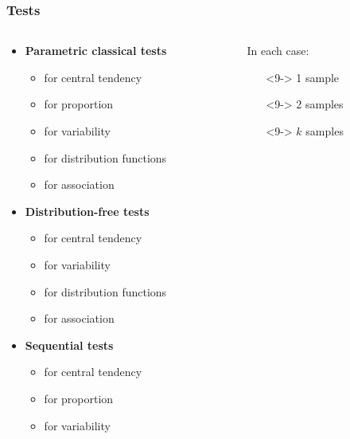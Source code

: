 \documentclass[xcolor={table}]{beamer}
\begin{document}
\begin{frame}\frametitle{Tests}
  \begin{columns}
    \begin{column}{0.7\textwidth}
      \begin{itemize}
      \item<1->\textbf{Parametric classical tests}
        \begin{itemize}
        \item<4-> for central tendency
        \item<5-> for proportion
        \item<6-> for variability
        \item<7-> for distribution functions
        \item<8-> for association
        \end{itemize}
      \item<2->\textbf{Distribution-free tests}
        \begin{itemize}
        \item<4-> for central tendency
        \item<6-> for variability
        \item<7-> for distribution functions
        \item<8-> for association
        \end{itemize}
      \item<3->\textbf{Sequential tests}
        \begin{itemize}
        \item<4-> for central tendency
        \item<5-> for proportion
        \item<6-> for variability
        \end{itemize}
      \end{itemize}
    \end{column}
    \begin{column}{0.3\textwidth}
      In each case:
      \begin{itemize}
        \item[]<9-> 1 sample
        \item[]<9-> 2 samples
        \item[]<9-> $k$ samples
      \end{itemize}
    \end{column}
  \end{columns}
\end{frame}
\end{document}
